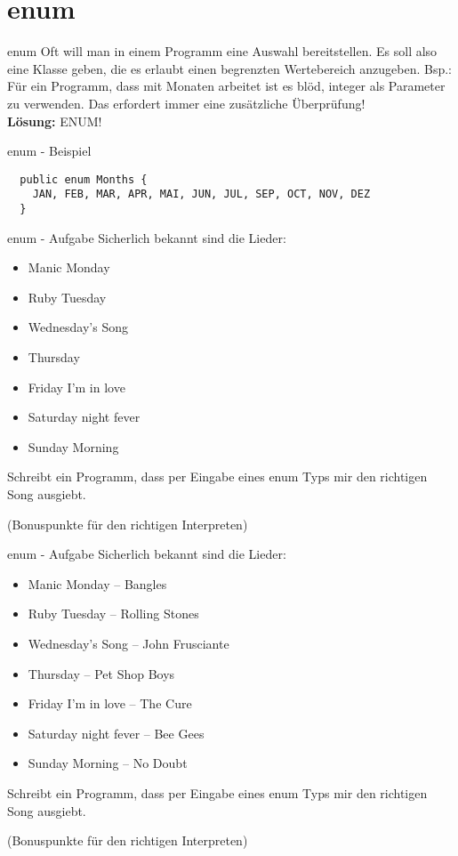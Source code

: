 \documentclass[18pt]{beamer}
\begin{document}
\section{enum}
\begin{frame}{enum}
 Oft will man in einem Programm eine Auswahl bereitstellen. Es soll also eine Klasse geben,
 die es erlaubt einen begrenzten Wertebereich anzugeben.
 Bsp.: Für ein Programm, dass mit Monaten arbeitet ist es blöd, integer als Parameter zu verwenden. Das erfordert immer eine
 zusätzliche Überprüfung! \\
 \pause
 \textbf{Lösung: } ENUM!
\end{frame}
\begin{frame}[fragile]{enum - Beispiel}
 \begin{lstlisting}
  public enum Months {
    JAN, FEB, MAR, APR, MAI, JUN, JUL, SEP, OCT, NOV, DEZ
  }
 \end{lstlisting}
\end{frame}

\begin{frame}{enum - Aufgabe}
 Sicherlich bekannt sind die Lieder: 
 \begin{itemize}
  \item Manic Monday
  \item Ruby Tuesday
  \item Wednesday's Song
  \item Thursday
  \item Friday I'm in love
  \item Saturday night fever
  \item Sunday Morning
 \end{itemize}
 Schreibt ein Programm, dass per Eingabe eines enum Typs mir den richtigen Song ausgiebt. 
 
 (Bonuspunkte für den richtigen Interpreten)
\end{frame}

\begin{frame}{enum - Aufgabe}
 Sicherlich bekannt sind die Lieder: 
 \begin{itemize}
  \item Manic Monday – Bangles
  \item Ruby Tuesday – Rolling Stones
  \item Wednesday's Song – John Frusciante
  \item Thursday – Pet Shop Boys
  \item Friday I'm in love – The Cure
  \item Saturday night fever – Bee Gees
  \item Sunday Morning – No Doubt
 \end{itemize}
 Schreibt ein Programm, dass per Eingabe eines enum Typs mir den richtigen Song ausgiebt. 
 
 (Bonuspunkte für den richtigen Interpreten)
\end{frame}
\end{document}
